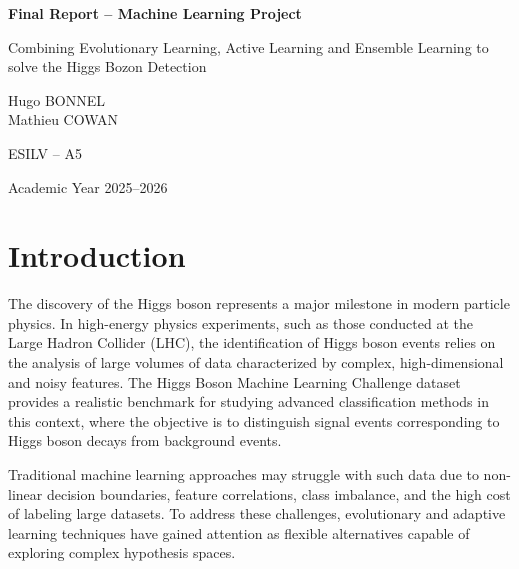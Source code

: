 \documentclass[12pt,a4paper]{article}
\begin{document}
\begin{titlepage}
    \centering
    \vspace*{3cm}

    {\LARGE \textbf{Final Report -- Machine Learning Project}\par}
    \vspace{0.5cm}
    {\Large Combining Evolutionary Learning, Active Learning and 
Ensemble Learning to solve the Higgs Bozon Detection \par}

    \vspace{2cm}

    {\large
    Hugo BONNEL \\
    Mathieu COWAN
    \par}

    \vspace{0.5cm}

    {\large
    ESILV -- A5
    \par}

    \vfill

    {\large
    Academic Year 2025--2026
    \par}

\end{titlepage}

\tableofcontents
 

\newpage
\section{Introduction}
The discovery of the Higgs boson represents a major milestone in modern particle physics.
In high-energy physics experiments, such as those conducted at the Large Hadron Collider (LHC),
the identification of Higgs boson events relies on the analysis of large volumes of data
characterized by complex, high-dimensional and noisy features.
The Higgs Boson Machine Learning Challenge dataset provides a realistic benchmark
for studying advanced classification methods in this context, where the objective is to
distinguish signal events corresponding to Higgs boson decays from background events.

Traditional machine learning approaches may struggle with such data due to
non-linear decision boundaries, feature correlations, class imbalance, and the high cost
of labeling large datasets.
To address these challenges, evolutionary and adaptive learning techniques have gained
attention as flexible alternatives capable of exploring complex hypothesis spaces.
\end{document}
